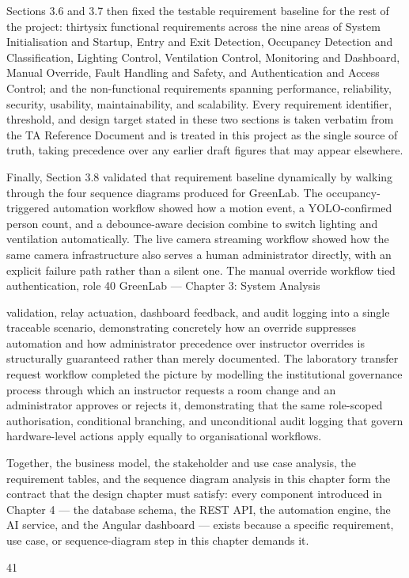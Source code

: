 Sections 3.6 and 3.7 then fixed the testable requirement baseline for the rest of the project: thirtysix functional requirements across the nine areas of System Initialisation and Startup, Entry and
Exit Detection, Occupancy Detection and Classification, Lighting Control, Ventilation Control,
Monitoring and Dashboard, Manual Override, Fault Handling and Safety, and Authentication and
Access Control; and the non-functional requirements spanning performance, reliability, security,
usability, maintainability, and scalability. Every requirement identifier, threshold, and design target
stated in these two sections is taken verbatim from the TA Reference Document and is treated in
this project as the single source of truth, taking precedence over any earlier draft figures that may
appear elsewhere.

Finally, Section 3.8 validated that requirement baseline dynamically by walking through the four
sequence diagrams produced for GreenLab. The occupancy-triggered automation workflow
showed how a motion event, a YOLO-confirmed person count, and a debounce-aware decision
combine to switch lighting and ventilation automatically. The live camera streaming workflow
showed how the same camera infrastructure also serves a human administrator directly, with an
explicit failure path rather than a silent one. The manual override workflow tied authentication, role
40
GreenLab --- Chapter 3: System Analysis


validation, relay actuation, dashboard feedback, and audit logging into a single traceable scenario,
demonstrating concretely how an override suppresses automation and how administrator
precedence over instructor overrides is structurally guaranteed rather than merely documented. The
laboratory transfer request workflow completed the picture by modelling the institutional
governance process through which an instructor requests a room change and an administrator
approves or rejects it, demonstrating that the same role-scoped authorisation, conditional
branching, and unconditional audit logging that govern hardware-level actions apply equally to
organisational workflows.

Together, the business model, the stakeholder and use case analysis, the requirement tables, and the
sequence diagram analysis in this chapter form the contract that the design chapter must satisfy:
every component introduced in Chapter 4 --- the database schema, the REST API, the automation
engine, the AI service, and the Angular dashboard --- exists because a specific requirement, use
case, or sequence-diagram step in this chapter demands it.




41
